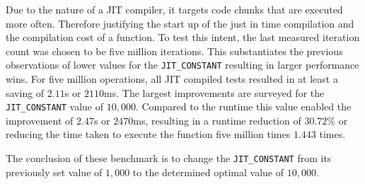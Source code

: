 Due to the nature of a JIT compiler, it targets code chunks that are executed
more often. Therefore justifying the start up of the just in time compilation
and the compilation cost of a function. To test this intent, the last measured
iteration count was chosen to be five million iterations. This substantiates
the previous observations of lower values for the \texttt{JIT\_CONSTANT}
resulting in larger performance wins. For five million operations, all JIT
compiled tests resulted in at least a saving of $2.11$s or $2110$ms. The
largest improvements are surveyed for the \texttt{JIT\_CONSTANT} value of
$10,000$. Compared to the runtime this value enabled the improvement of $2.47$s
or $2470$ms, resulting in a runtime reduction of $30.72\%$ or reducing the time
taken to execute the function five million times $1.443$ times.

The conclusion of these benchmark is to change the \texttt{JIT\_CONSTANT} from
its previously set value of $1,000$ to the determined optimal value of
$10,000$.

